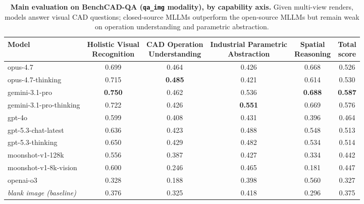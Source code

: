 \begin{table}[t]
\centering
\small
\setlength{\tabcolsep}{5pt}
\renewcommand{\arraystretch}{1.15}
\caption{\textbf{Main evaluation on BenchCAD-QA (\texttt{qa\_img} modality), by capability axis.} Given multi-view renders, models answer visual CAD questions; closed-source MLLMs outperform the open-source MLLMs but remain weak on operation understanding and parametric abstraction.}
\label{tab:main_eval_qa_img}
\begin{tabular}{l c c c c c}
\toprule
Model
 & \shortstack{Holistic Visual\\Recognition}
 & \shortstack{CAD Operation\\Understanding}
 & \shortstack{Industrial Parametric\\Abstraction}
 & \shortstack{Spatial\\Reasoning}
 & \shortstack{Total\\score} \\
\midrule
opus-4.7         & 0.699 & 0.464 & 0.426 & 0.668 & 0.526 \\
opus-4.7-thinking            & 0.715 & \textbf{0.485} & 0.421 & 0.614 & 0.530 \\
gemini-3.1-pro  & \textbf{0.750} & 0.462 & 0.536 & \textbf{0.688} & \textbf{0.587} \\
gemini-3.1-pro-thinking     & 0.722 & 0.426 & \textbf{0.551} & 0.669 & 0.576 \\
gpt-4o                              & 0.599 & 0.408 & 0.431 & 0.396 & 0.464 \\
gpt-5.3-chat-latest                 & 0.636 & 0.423 & 0.488 & 0.548 & 0.513 \\
gpt-5.3-thinking                    & 0.650 & 0.429 & 0.482 & 0.534 & 0.514 \\
moonshot-v1-128k     & 0.556 & 0.387 & 0.427 & 0.334 & 0.442 \\

  moonshot-v1-8k-vision         & 0.600 & 0.246 & 0.465 & 0.181 & 0.447 \\                                                                    
  openai-o3                             & 0.328 & 0.188 & 0.398 & 0.560 & 0.327 \\  
\midrule
\textit{blank image (baseline)}     & 0.376    & 0.325    & 0.418    & 0.296    & 0.375    \\
\bottomrule
\end{tabular}
\end{table}
